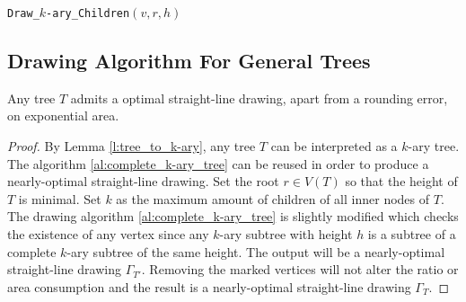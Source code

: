 \begin{algorithm}[H]
	\caption{\texttt{Draw\_$k$-ary\_Children}$(v,r,h)$}
\end{algorithm}

\subsection{Drawing Algorithm For General Trees}

\begin{theorem}
	Any tree $T$ admits a optimal straight-line drawing, apart from a rounding error, on exponential area.
\end{theorem}
\begin{proof}
	By Lemma \ref{l:tree_to_k-ary}, any tree $T$ can be interpreted as a $k$-ary tree. The algorithm \ref{al:complete_k-ary_tree} can be reused in order to produce a nearly-optimal straight-line drawing. Set the root $r \in V(T)$ so that the height of $T$ is minimal. Set $k$ as the maximum amount of children of all inner nodes of $T$. The drawing algorithm \ref{al:complete_k-ary_tree} is slightly modified which checks the existence of any vertex since any $k$-ary subtree with height $h$ is a subtree of a complete $k$-ary subtree of the same height. The output will be a nearly-optimal straight-line drawing $\Gamma_{T'}$. Removing the marked vertices will not alter the ratio or area consumption and the result is a nearly-optimal straight-line drawing $\Gamma_T$.
	
\end{proof}

